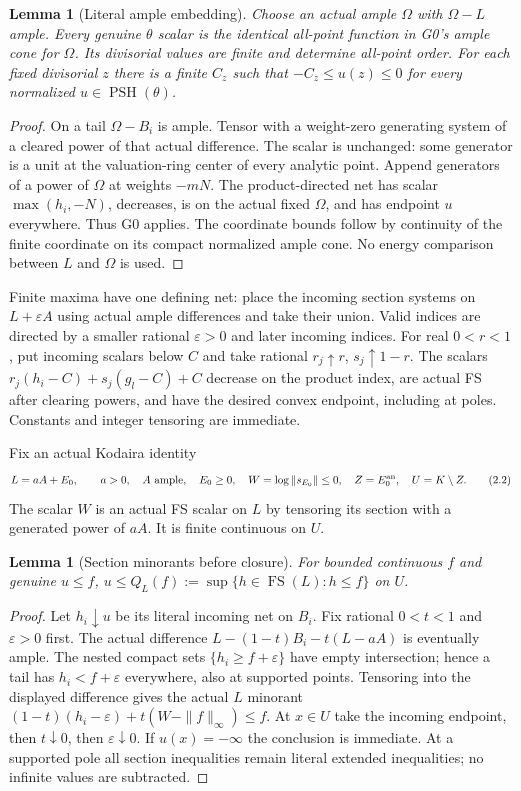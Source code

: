 \documentclass[10pt]{article}
\newtheorem{lemma}[theorem]{Lemma}
\newcommand{\PSH}{\operatorname{PSH}}
\newcommand{\FS}{\operatorname{FS}}
\begin{document}
\begin{lemma}[Literal ample embedding]\label{embed}
Choose an actual ample $\Omega$ with $\Omega-L$ ample. Every genuine
$\theta$ scalar is the identical all-point function in G0's ample cone
for $\Omega$. Its divisorial values are finite and determine all-point
order. For each fixed divisorial $z$ there is a finite $C_z$ such that
$-C_z\leq u(z)\leq0$ for every normalized $u\in\PSH(\theta)$.
\end{lemma}
\begin{proof}
On a tail $\Omega-B_i$ is ample. Tensor with a weight-zero generating
system of a cleared power of that actual difference. The scalar is
unchanged: some generator is a unit at the valuation-ring center of every
analytic point. Append generators of a power of $\Omega$ at weights
$-mN$. The product-directed net has scalar $\max(h_i,-N)$, decreases,
is on the actual fixed $\Omega$, and has endpoint $u$ everywhere.
Thus G0 applies. The coordinate bounds follow by continuity of the finite
coordinate on its compact normalized ample cone. No energy comparison
between $L$ and $\Omega$ is used.
\end{proof}

Finite maxima have one defining net: place the incoming section systems
on $L+\varepsilon A$ using actual ample differences and take their union.
Valid indices are directed by a smaller rational $\varepsilon>0$ and
later incoming indices. For real $0<r<1$, put incoming scalars below $C$
and take rational $r_j\uparrow r$, $s_j\uparrow1-r$. The scalars
$r_j(h_i-C)+s_j(g_l-C)+C$ decrease on the product index, are actual FS
after clearing powers, and have the desired convex endpoint, including
at poles. Constants and integer tensoring are immediate.

Fix an actual Kodaira identity
\[
 L=aA+E_0,\qquad a>0,\quad A\text{ ample},\quad E_0\geq0,
 \quad W=\log\|s_{E_0}\|\leq0,
 \quad Z=E_0^{\rm an},\quad U=K\setminus Z.
 \tag{2.2}
\]
The scalar $W$ is an actual FS scalar on $L$ by tensoring its section
with a generated power of $aA$. It is finite continuous on $U$.

\begin{lemma}[Section minorants before closure]\label{density}
For bounded continuous $f$ and genuine $u\leq f$,
$u\leq Q_L(f):=\sup\{h\in\FS(L):h\leq f\}$ on $U$.
\end{lemma}
\begin{proof}
Let $h_i\downarrow u$ be its literal incoming net on $B_i$.
Fix rational $0<t<1$ and $\varepsilon>0$ first. The actual difference
$L-(1-t)B_i-t(L-aA)$ is eventually ample. The nested compact sets
$\{h_i\geq f+\varepsilon\}$ have empty intersection; hence a tail
has $h_i<f+\varepsilon$ everywhere, also at supported points.
Tensoring into the displayed difference gives the actual $L$ minorant
$(1-t)(h_i-\varepsilon)+t(W-\|f\|_\infty)\leq f$.
At $x\in U$ take the incoming endpoint, then $t\downarrow0$, then
$\varepsilon\downarrow0$. If $u(x)=-\infty$ the conclusion is immediate.
At a supported pole all section inequalities remain literal extended
inequalities; no infinite values are subtracted.
\end{proof}
\end{document}
